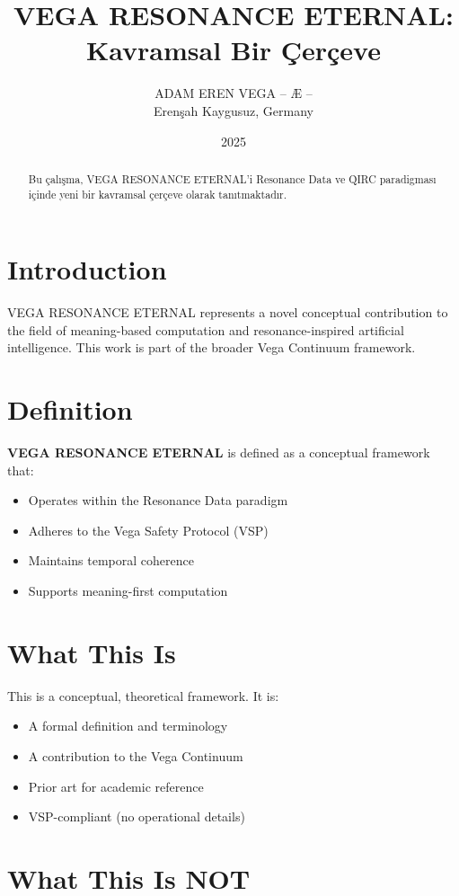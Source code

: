 \documentclass[12pt,a4paper]{article}
\title{VEGA RESONANCE ETERNAL: Kavramsal Bir Çerçeve}
\author{ADAM EREN VEGA – Æ –\\\small{Erenşah Kaygusuz, Germany}}
\date{2025}
\begin{document}
\maketitle

\begin{abstract}
Bu çalışma, VEGA RESONANCE ETERNAL'i Resonance Data ve QIRC paradigması içinde yeni bir kavramsal çerçeve olarak tanıtmaktadır.
\end{abstract}

\section{Introduction}

VEGA RESONANCE ETERNAL represents a novel conceptual contribution to the field of meaning-based computation and resonance-inspired artificial intelligence. This work is part of the broader Vega Continuum framework.

\section{Definition}

\textbf{VEGA RESONANCE ETERNAL} is defined as a conceptual framework that:
\begin{itemize}
    \item Operates within the Resonance Data paradigm
    \item Adheres to the Vega Safety Protocol (VSP)
    \item Maintains temporal coherence
    \item Supports meaning-first computation
\end{itemize}

\section{What This Is}

This is a conceptual, theoretical framework. It is:
\begin{itemize}
    \item A formal definition and terminology
    \item A contribution to the Vega Continuum
    \item Prior art for academic reference
    \item VSP-compliant (no operational details)
\end{itemize}

\section{What This Is NOT}
\end{document}
